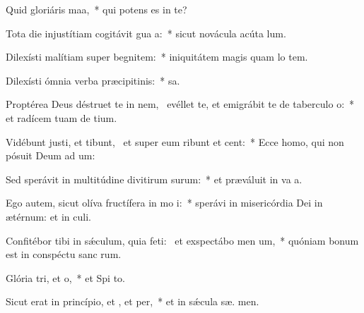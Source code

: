 \item Quid gloriáris  maa,~* qui potens es in te?
\item Tota die injustítiam cogitávit gua a:~* sicut novácula acúta  lum.
\item Dilexísti malítiam super begnitem:~* iniquitátem magis quam lo tem.
\item Dilexísti ómnia verba præcipitinis:~*  sa.
\item Proptérea Deus déstruet te in nem,~\pscross{} evéllet te, et emigrábit te de taberculo o:~* et radícem tuam de  tium.
\item Vidébunt justi, et tibunt,~\pscross{} et super eum ribunt et cent:~* Ecce homo, qui non pósuit Deum ad um:
\item Sed sperávit in multitúdine divitirum surum:~* et præváluit in va a.
\item Ego autem, sicut olíva fructífera in mo i:~* sperávi in misericórdia Dei in ætérnum: et in  culi.
\item Confitébor tibi in sǽculum, quia feti:~\pscross{} et exspectábo men um,~* quóniam bonum est in conspéctu sanc rum.
\item Glória tri, et o,~* et Spi to.
\item Sicut erat in princípio, et , et per,~* et in sǽcula sæ. men.
